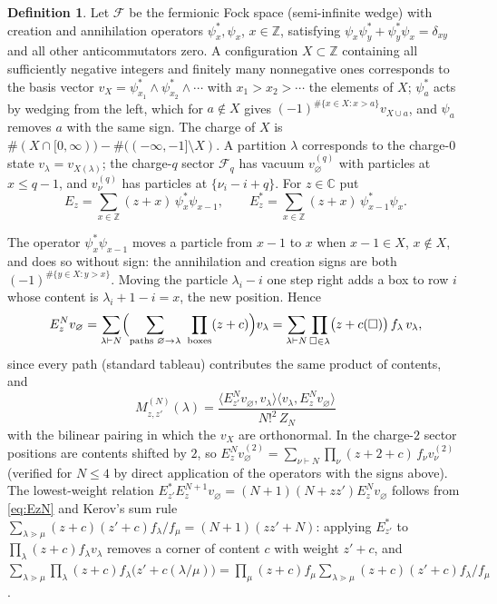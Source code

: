 \documentclass[11pt]{article}
\theoremstyle{definition}
\newtheorem{definition}[theorem]{Definition}
\theoremstyle{remark}
\newcommand{\Z}{\mathbb{Z}}
\newcommand{\C}{\mathbb{C}}
\newcommand{\ket}[1]{v_{#1}}
\begin{document}
\begin{definition}
Let $\mathcal F$ be the fermionic Fock space (semi-infinite wedge) with creation and annihilation operators $\psi^*_x,\psi_x$, $x\in\Z$, satisfying $\psi_x\psi^*_y+\psi^*_y\psi_x=\delta_{xy}$ and all other anticommutators zero. A configuration $X\subset\Z$ containing all sufficiently negative integers and finitely many nonnegative ones corresponds to the basis vector $\ket X=\psi^*_{x_1}\wedge\psi^*_{x_2}\wedge\cdots$ with $x_1>x_2>\cdots$ the elements of $X$; $\psi^*_a$ acts by wedging from the left, which for $a\notin X$ gives $(-1)^{\#\{x\in X:x>a\}}\ket{X\cup a}$, and $\psi_a$ removes $a$ with the same sign. The charge of $X$ is $\#(X\cap[0,\infty))-\#((-\infty,-1]\setminus X)$. A partition $\lambda$ corresponds to the charge-$0$ state $\ket\lambda=\ket{X(\lambda)}$; the charge-$q$ sector $\mathcal F_q$ has vacuum $\ket\varnothing^{(q)}$ with particles at $x\le q-1$, and $\ket\nu^{(q)}$ has particles at $\{\nu_i-i+q\}$. For $z\in\C$ put
\[
E_z=\sum_{x\in\Z}(z+x)\,\psi^*_x\psi_{x-1},\qquad E_z^*=\sum_{x\in\Z}(z+x)\,\psi^*_{x-1}\psi_x .
\]
\end{definition}

The operator $\psi^*_x\psi_{x-1}$ moves a particle from $x-1$ to $x$ when $x-1\in X$, $x\notin X$, and does so without sign: the annihilation and creation signs are both $(-1)^{\#\{y\in X:y>x\}}$. Moving the particle $\lambda_i-i$ one step right adds a box to row $i$ whose content is $\lambda_i+1-i=x$, the new position. Hence
\begin{equation}\label{eq:EzN}
E_z^N\ket\varnothing=\sum_{\lambda\vdash N}\Bigl(\sum_{\text{paths }\varnothing\to\lambda}\ \prod_{\text{boxes}}(z+c)\Bigr)\ket\lambda=\sum_{\lambda\vdash N}\prod_{\square\in\lambda}\bigl(z+c(\square)\bigr)\,f_\lambda\,\ket\lambda ,
\end{equation}
since every path (standard tableau) contributes the same product of contents, and
\[
M^{(N)}_{z,z'}(\lambda)=\frac{\langle E_{z'}^N\ket\varnothing,\ket\lambda\rangle\langle\ket\lambda,E_z^N\ket\varnothing\rangle}{N!^2\,Z_N}
\]
with the bilinear pairing in which the $\ket X$ are orthonormal. In the charge-$2$ sector positions are contents shifted by $2$, so $E_z^N\ket\varnothing^{(2)}=\sum_{\nu\vdash N}\prod_\nu(z+2+c)\,f_\nu\ket\nu^{(2)}$ (verified for $N\le4$ by direct application of the operators with the signs above). The lowest-weight relation $E_{z'}^*E_z^{N+1}\ket\varnothing=(N+1)(N+zz')E_z^N\ket\varnothing$ follows from \eqref{eq:EzN} and Kerov's sum rule $\sum_{\lambda\gtrdot\mu}(z+c)(z'+c)f_\lambda/f_\mu=(N+1)(zz'+N)$: applying $E_{z'}^*$ to $\prod_\lambda(z+c)f_\lambda\ket\lambda$ removes a corner of content $c$ with weight $z'+c$, and $\sum_{\lambda\gtrdot\mu}\prod_\lambda(z+c)f_\lambda\bigl(z'+c(\lambda/\mu)\bigr)=\prod_\mu(z+c)f_\mu\sum_{\lambda\gtrdot\mu}(z+c)(z'+c)f_\lambda/f_\mu$.
\end{document}
